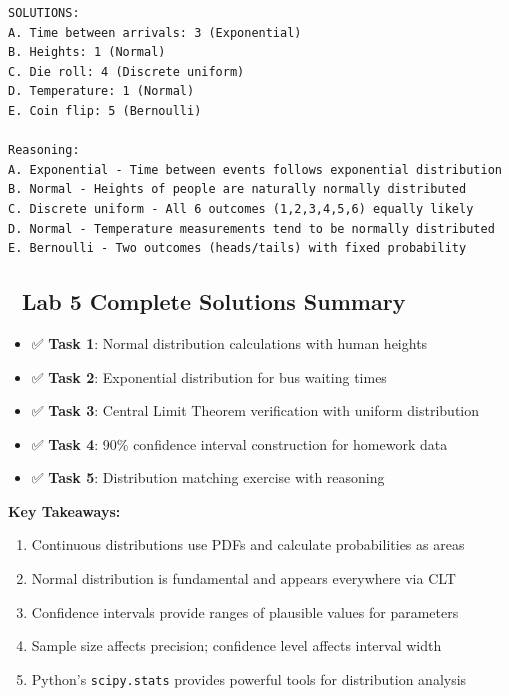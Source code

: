 \documentclass[
  letterpaper,
  DIV=11,
  numbers=noendperiod]{scrartcl}
\providecommand{\tightlist}{%
  \setlength{\itemsep}{0pt}\setlength{\parskip}{0pt}}\usepackage{longtable,booktabs,array}
\begin{document}
\begin{verbatim}
SOLUTIONS:
A. Time between arrivals: 3 (Exponential)
B. Heights: 1 (Normal)
C. Die roll: 4 (Discrete uniform)
D. Temperature: 1 (Normal)
E. Coin flip: 5 (Bernoulli)

Reasoning:
A. Exponential - Time between events follows exponential distribution
B. Normal - Heights of people are naturally normally distributed
C. Discrete uniform - All 6 outcomes (1,2,3,4,5,6) equally likely
D. Normal - Temperature measurements tend to be normally distributed
E. Bernoulli - Two outcomes (heads/tails) with fixed probability
\end{verbatim}

\subsection{🎯 Lab 5 Complete Solutions
Summary}\label{lab-5-complete-solutions-summary}

\begin{itemize}
\tightlist
\item
  ✅ \textbf{Task 1}: Normal distribution calculations with human
  heights
\item
  ✅ \textbf{Task 2}: Exponential distribution for bus waiting times\\
\item
  ✅ \textbf{Task 3}: Central Limit Theorem verification with uniform
  distribution
\item
  ✅ \textbf{Task 4}: 90\% confidence interval construction for homework
  data
\item
  ✅ \textbf{Task 5}: Distribution matching exercise with reasoning
\end{itemize}

\textbf{Key Takeaways:}

\begin{enumerate}
\def\labelenumi{\arabic{enumi}.}
\item
  Continuous distributions use PDFs and calculate probabilities as areas
\item
  Normal distribution is fundamental and appears everywhere via CLT
\item
  Confidence intervals provide ranges of plausible values for parameters
\item
  Sample size affects precision; confidence level affects interval width
\item
  Python's \texttt{scipy.stats} provides powerful tools for distribution
  analysis
\end{enumerate}
\end{document}
